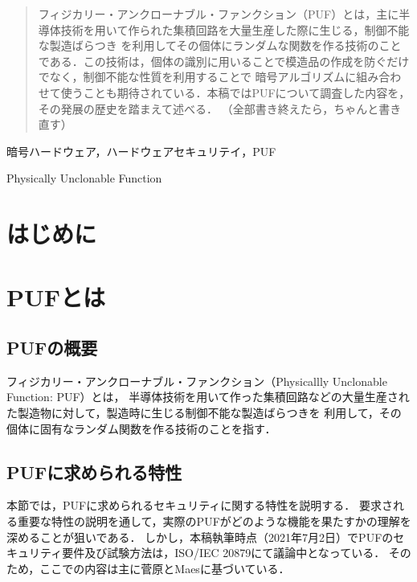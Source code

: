 \documentclass[survey]{ieicej}%
\begin{document}
\begin{abstract}
  フィジカリー・アンクローナブル・ファンクション（PUF）とは，主に半導体技術を用いて作られた集積回路を大量生産した際に生じる，制御不能な製造ばらつき
  を利用してその個体にランダムな関数を作る技術のことである．この技術は，個体の識別に用いることで模造品の作成を防ぐだけでなく，制御不能な性質を利用することで
  暗号アルゴリズムに組み合わせて使うことも期待されている．本稿ではPUFについて調査した内容を，その発展の歴史を踏まえて述べる．
  （全部書き終えたら，ちゃんと書き直す）
\end{abstract}
\begin{keyword}
  暗号ハードウェア，ハードウェアセキュリテイ，PUF
\end{keyword}
\begin{eabstract}
\end{eabstract}
\begin{ekeyword}
  Physically Unclonable Function
\end{ekeyword}
\maketitle

\section{はじめに}


\section{PUFとは}
\subsection{PUFの概要}
フィジカリー・アンクローナブル・ファンクション（Physicallly Unclonable Function: PUF）とは，
半導体技術を用いて作った集積回路などの大量生産された製造物に対して，製造時に生じる制御不能な製造ばらつきを
利用して，その個体に固有なランダム関数を作る技術のことを指す．
\subsection{PUFに求められる特性}
本節では，PUFに求められるセキュリティに関する特性を説明する．
要求される重要な特性の説明を通して，実際のPUFがどのような機能を果たすかの理解を深めることが狙いである．
しかし，本稿執筆時点（2021年7月2日）でPUFのセキュリティ要件及び試験方法は，ISO/IEC 20879にて議論中となっている．
そのため，ここでの内容は主に菅原\cite{sugatake}とMaes\cite{maes1}に基づいている．
\end{document}
